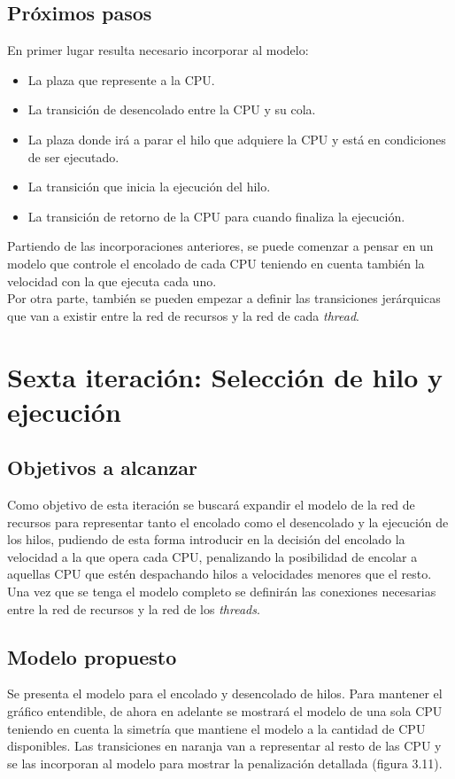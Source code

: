 \documentclass[a4paper]{book}
\begin{document}
\subsection{Pr\'oximos pasos}
En primer lugar resulta necesario incorporar al modelo:
\begin{itemize}
\item La plaza que represente a la CPU.
\item La transici\'on de desencolado entre la CPU y su cola.
\item La plaza donde ir\'a a parar el hilo que adquiere la CPU y est\'a en condiciones de ser ejecutado.
\item La transici\'on que inicia la ejecuci\'on del hilo.
\item La transici\'on de retorno de la CPU para cuando finaliza la ejecuci\'on.
\end{itemize}

Partiendo de las incorporaciones anteriores, se puede comenzar a pensar en un modelo que controle el encolado de cada CPU teniendo en cuenta tambi\'en la velocidad con la que ejecuta cada uno.\\

Por otra parte, tambi\'en se pueden empezar a definir las transiciones jer\'arquicas que van a existir entre la red de recursos y la red de cada \emph{thread}.


\newpage
\section{Sexta iteraci\'on: Selecci\'on de hilo y ejecuci\'on}

\subsection{Objetivos a alcanzar}
Como objetivo de esta iteraci\'on se buscar\'a expandir el modelo de la red de recursos para representar tanto el encolado como el desencolado y la ejecuci\'on de los hilos, pudiendo de esta forma introducir en la decisi\'on del encolado la velocidad a la que opera cada CPU, penalizando la posibilidad de encolar a aquellas CPU que est\'en despachando hilos a velocidades menores que el resto. Una vez que se tenga el modelo completo se definir\'an las conexiones necesarias entre la red de recursos y la red de los \emph{threads}.

\subsection{Modelo propuesto}
Se presenta el modelo para el encolado y desencolado de hilos. Para mantener el gr\'afico entendible, de ahora en adelante se mostrar\'a el modelo de una sola CPU teniendo en cuenta la simetr\'ia que mantiene el modelo a la cantidad de CPU disponibles. Las transiciones en naranja van a representar al resto de las CPU y se las incorporan al modelo para mostrar la penalizaci\'on detallada (figura 3.11).
\end{document}
